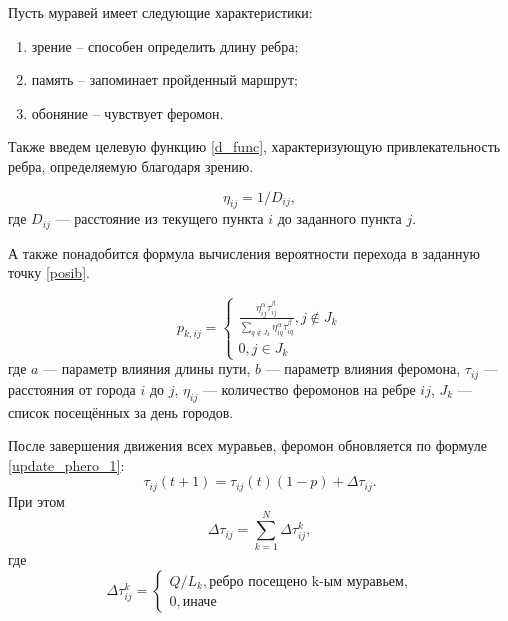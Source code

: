 Пусть муравей имеет следующие характеристики:
\begin{enumerate}[label=\arabic*)]
	\item зрение -- способен определить длину ребра;
	\item память -- запоминает пройденный маршрут;
	\item обоняние -- чувствует феромон.
\end{enumerate}


Также введем целевую функцию \eqref{d_func}, характеризующую привлекательность ребра, определяемую благодаря зрению.

\begin{equation}
	\label{d_func}
	\eta_{ij} = 1 / D_{ij},
\end{equation}
где $D_{ij}$ — расстояние из текущего пункта $i$ до заданного пункта $j$.


А также понадобится формула вычисления вероятности перехода в заданную точку \eqref{posib}.

\begin{equation}
	\label{posib}
	p_{k,ij} = \begin{cases}
		\frac{\eta_{ij}^{\alpha}\tau_{ij}^{\beta}}{\sum_{q\notin J_k} \eta^\alpha_{iq}\tau^\beta_{iq}}, j \notin J_k \\
		0, j \in J_k
	\end{cases}
\end{equation}
где $a$ --- параметр влияния длины пути, $b$ --- параметр влияния феромона, $\tau_{ij}$ --- расстояния от города $i$ до $j$, $\eta_{ij}$ --- количество феромонов на ребре $ij$, $J_k$ --- список посещённых за день городов.

После завершения движения всех муравьев, феромон обновляется по формуле \eqref{update_phero_1}:
\begin{equation}
	\label{update_phero_1}
	\tau_{ij}(t+1) = \tau_{ij}(t)(1-p) + \Delta \tau_{ij}.
\end{equation}
При этом
\begin{equation}
	\label{update_phero_2}
	\Delta \tau_{ij} = \sum_{k=1}^N \Delta \tau^k_{ij},
\end{equation}
где
\begin{equation}
	\label{update_phero_3}
	\Delta\tau^k_{ij} = \begin{cases}
		Q/L_{k}, \textrm{ребро посещено k-ым муравьем,} \\
		0, \textrm{иначе}
	\end{cases}
\end{equation}


